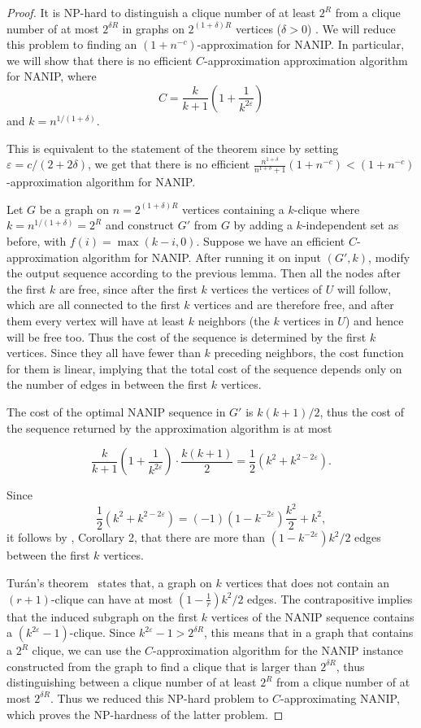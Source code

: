 \begin{proof}
It is NP-hard to distinguish a clique number of at least $2^R$ from a clique
number of at most $2^{\delta R}$ in graphs on $2^{(1+\delta)R}$ vertices ($\delta>0$)
\cite{Zuckerman06}.  We will reduce this problem to finding an
$(1+n^{-c})$-approximation for NANIP.  In particular, we will show that there
is no efficient $C$-approximation approximation algorithm for NANIP, where $$ C
= \frac{k}{k+1} \left ( 1 + \frac{1}{k^{2\varepsilon}} \right ) $$ and
$k=n^{1/(1+\delta)}$.

This is equivalent to the statement of the theorem since by setting
$\varepsilon=c/(2+2\delta)$, we get that there is no efficient
$\frac{n^{1+\delta}}{n^{1+\delta}+1}(1+n^{-c})<(1+n^{-c})$-approximation
algorithm for NANIP.

Let $G$ be a graph on $n=2^{(1+\delta)R}$ vertices containing a $k$-clique
where $k=n^{1/(1+\delta)}=2^R$ and construct $G'$ from $G$ by adding a
$k$-independent set as before, with $f(i)=\max(k-i, 0)$. Suppose we have an
efficient $C$-approximation algorithm for NANIP. After running it on input
$(G', k)$, modify the output sequence according to the previous lemma. Then all
the nodes after the first $k$ are free, since after the first $k$ vertices the
vertices of $U$ will follow, which are all connected to the first $k$ vertices
and are therefore free, and after them every vertex will have at least $k$ neighbors
(the $k$ vertices in $U$) and hence will be free too.
Thus the cost of the sequence is
determined by the first $k$ vertices. Since they all have fewer than $k$
preceding neighbors, the cost function for them is linear, implying that the
total cost of the sequence depends only on the number of edges in between the
first $k$ vertices.

The cost of the optimal NANIP sequence in $G'$ is $k(k+1)/2$, thus the cost of
the sequence returned by the approximation algorithm is at most

$$ \frac{k}{k+1}\left(1+\frac{1}{k^{2\varepsilon}}\right)\cdot \frac{k(k+1)}{2} =
\frac12(k^2+k^{2-2\varepsilon}).$$

Since $$\frac12(k^2+k^{2-2\varepsilon})=(-1)(1-k^{-2\varepsilon})\frac{k^2}{2}+k^2,$$ it
follows by \cite{Gutfraind14}, Corollary 2, that there are more than
$(1-k^{-2\varepsilon})k^2/2$ edges between the first $k$ vertices.

Tur\'an's theorem~\cite{Turan1941} states that, a graph on $k$ vertices that
does not contain an $(r+1)$-clique can have at most $(1-\frac1r)k^2/2$ edges.
The contrapositive implies that the induced subgraph on the first $k$ vertices
of the NANIP sequence contains a $(k^{2\varepsilon}-1)$-clique. Since $k^{2\varepsilon}-1>
2^{\delta R}$, this means that in a graph that contains a $2^R$ clique,
we can use the $C$-approximation algorithm for the NANIP instance constructed
from the graph to find a clique that is larger than $2^{\delta R}$,
thus distinguishing between a clique number of at least $2^R$ from a clique
number of at most $2^{\delta R}$. Thus we reduced this NP-hard problem
to $C$-approximating NANIP, which proves the NP-hardness of the latter problem.
\end{proof}


